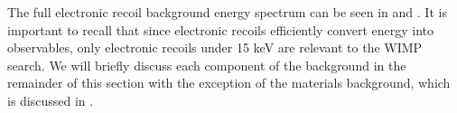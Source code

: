 The full electronic recoil background energy spectrum can be seen in  and .  It is important to recall that since electronic recoils efficiently convert energy into observables, only electronic recoils under 15 keV are relevant to the WIMP search.  We will briefly discuss each component of the background in the remainder of this section with the exception of the materials background, which is discussed in .



